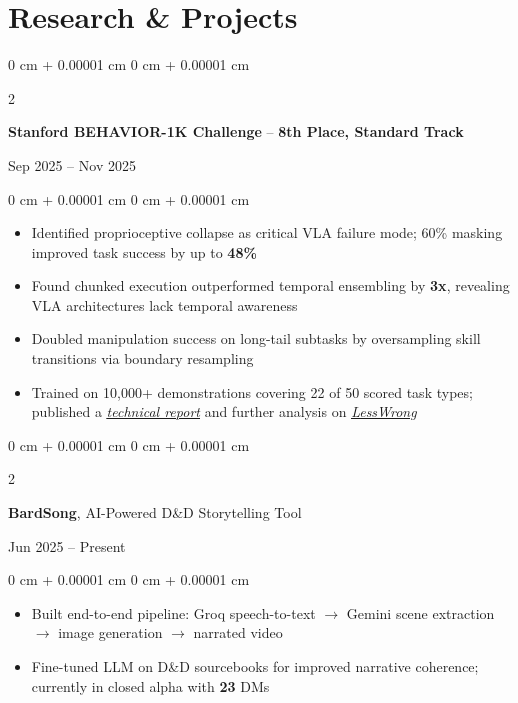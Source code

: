 \documentclass[10pt, letterpaper]{article}
\newenvironment{highlights}{
    \begin{itemize}[
        topsep=0.10 cm,
        parsep=0.10 cm,
        partopsep=0pt,
        itemsep=0pt,
        leftmargin=0 cm + 10pt
    ]
}{
    \end{itemize}
} %
\newenvironment{onecolentry}{
    \begin{adjustwidth}{
        0 cm + 0.00001 cm
    }{
        0 cm + 0.00001 cm
    }
}{
    \end{adjustwidth}
} %
\newenvironment{twocolentry}[2][]{
    \onecolentry
    \def\secondColumn{#2}
    \setcolumnwidth{\fill, 4.5 cm}
    \begin{paracol}{2}
}{
    \switchcolumn \raggedleft \secondColumn
    \end{paracol}
    \endonecolentry
} %
\let\hrefWithoutArrow\href
\begin{document}
\section{Research \& Projects}
    \begin{twocolentry}{Sep 2025 – Nov 2025}
        \textbf{Stanford BEHAVIOR-1K Challenge} -- \textbf{8th Place, Standard Track}
    \end{twocolentry}
    \vspace{0.10 cm}
    \begin{onecolentry}
        \begin{highlights}
            \item Identified proprioceptive collapse as critical VLA failure mode; 60\% masking improved task success by up to \textbf{48\%}
            \item Found chunked execution outperformed temporal ensembling by \textbf{3x}, revealing VLA architectures lack temporal awareness
            \item Doubled manipulation success on long-tail subtasks by oversampling skill transitions via boundary resampling
            \item Trained on 10,000+ demonstrations covering 22 of 50 scored task types; published a \hrefWithoutArrow{https://merlyn-labs.com/behavior-report}{\emph{\ul{technical report}}} and further analysis on \hrefWithoutArrow{https://www.lesswrong.com/posts/4p2HBMxCkh7pZ3xCa}{\emph{\ul{LessWrong}}}
        \end{highlights}
    \end{onecolentry}

    \vspace{0.2 cm}
    \begin{twocolentry}{Jun 2025 – Present}
        \textbf{BardSong}, AI-Powered D\&D Storytelling Tool
    \end{twocolentry}
    \vspace{0.10 cm}
    \begin{onecolentry}
        \begin{highlights}
            \item Built end-to-end pipeline: Groq speech-to-text $\rightarrow$ Gemini scene extraction $\rightarrow$ image generation $\rightarrow$ narrated video
            \item Fine-tuned LLM on D\&D sourcebooks for improved narrative coherence; currently in closed alpha with \textbf{23} DMs
        \end{highlights}
    \end{onecolentry}
\end{document}
